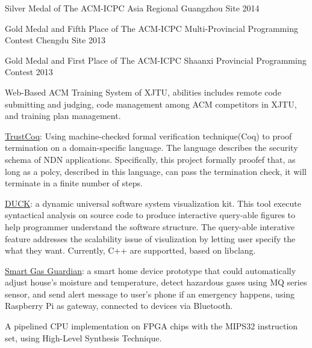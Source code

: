 \documentclass[]{deedy-resume-openfont}
\begin{document}
\begin{tightemize}
\item Silver Medal of The ACM-ICPC Asia Regional Guangzhou Site 2014
\item Gold Medal and Fifth Place of The ACM-ICPC Multi-Provincial Programming Contest Chengdu Site 2013
\item Gold Medal and First Place of The ACM-ICPC Shaanxi Provincial Programming Contest 2013
\item Web-Based ACM Training System of XJTU, abilities includes remote code submitting and judging, code management among ACM competitors in XJTU, and training plan management.
\end{tightemize}
\sectionsep

\begin{tightemize}
\item \href{https://github.com/Stumble/TrustCoq}{TrustCoq}: Using machine-checked formal verification technique(Coq) to proof termination on a domain-specific language. The language describes the security schema of NDN applications. Specifically, this project formally proofef that, as long as a polcy, described in this language, can pass the termination check, it will terminate in a finite number of steps.
\item \href{https://github.com/Stumble/duck}{DUCK}: a dynamic universal software system visualization kit. This tool execute syntactical analysis on source code to produce interactive query-able figures to help programmer understand the software structure. The query-able interative feature addresses the scalability issue of visulization by letting user specify the what they want. Currently, C++ are supportted, based on libclang.
\item \href{https://github.com/Stumble/smartGG}{Smart Gas Guardian}: a smart home device prototype that could automatically adjust house’s moisture and temperature, detect hazardous gases using MQ series sensor, and send alert message to user’s phone if an emergency happens, using Raspberry Pi as gateway, connected to devices via Bluetooth.
\item A pipelined CPU implementation on FPGA chips with the MIPS32 instruction set, using High-Level Synthesis Technique.
\end{tightemize}
\end{document}
